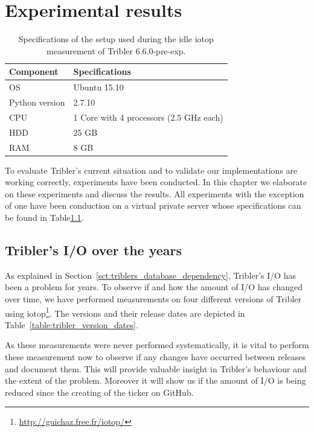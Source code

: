 \chapter{Experimental results}
\label{cpt:experiments}

\begin{table}[h]
	\centering
	\begin{tabular}{l|l}
		\textbf{Component} 	& \textbf{Specifications} \\ \hline
		OS   				& Ubuntu 15.10 \\
		Python version		& 2.7.10 \\
		CPU					& 1 Core with 4 processors (2.5 GHz each) \\ 
		HDD					& 25 GB  \\ 
		RAM					& 8 GB  \\
	\end{tabular}
	\caption{Specifications of the setup used during the idle iotop measurement of Tribler 6.6.0-pre-exp.}
	\label{table:virtual_machine_specs}
\end{table}

To evaluate Tribler's current situation and to validate our implementations are working correctly, experiments have been conducted.
In this chapter we elaborate on these experiments and discuss the results. 
All experiments with the exception of one have been conduction on a virtual private server whose specifications can be found in Table\ref{table:virtual_machine_specs}.

\section{Tribler's I/O over the years}
As explained in Section~\ref{sct:triblers_database_dependency}, Tribler's I/O has been a problem for years.
To observe if and how the amount of I/O has changed over time, we have performed measurements on four  different versions of Tribler using iotop\footnote{\url{http://guichaz.free.fr/iotop/}}.
The versions and their release dates are depicted in Table~\ref{table:tribler_version_dates}.

As these measurements were never performed systematically, it is vital to perform these measurement now to observe if any changes have occurred between releases and document them.
This will provide valuable insight in Tribler's behaviour and the extent of the problem.
Moreover it will show us if the amount of I/O is being reduced since the creating of the ticker on GitHub.

